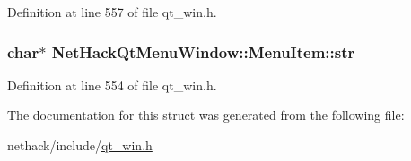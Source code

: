 Definition at line 557 of file qt\+\_\+win.\+h.

\hypertarget{structNetHackQtMenuWindow_1_1MenuItem_a122dd4ed13fcba6c753c0fce67912581}{
\subsubsection[{str}]{ char$\ast$ Net\+Hack\+Qt\+Menu\+Window\+::\+Menu\+Item\+::str}}\label{structNetHackQtMenuWindow_1_1MenuItem_a122dd4ed13fcba6c753c0fce67912581}


Definition at line 554 of file qt\+\_\+win.\+h.



The documentation for this struct was generated from the following file\+:\begin{DoxyCompactItemize}
\item 
nethack/include/\hyperlink{qt__win_8h}{qt\+\_\+win.\+h}\end{DoxyCompactItemize}
